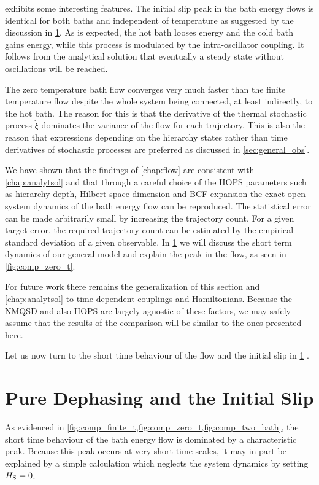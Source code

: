  exhibits some interesting features. The
initial slip peak in the bath energy flows is identical for both baths
and independent of temperature as suggested by the discussion in
\cref{sec:pure_deph}. As is expected, the hot bath looses energy and
the cold bath gains energy, while this process is modulated by the
intra-oscillator coupling. It follows from the analytical solution
that eventually a steady state without oscillations will be reached.

The zero temperature bath flow converges very much faster than the
finite temperature flow despite the whole system being connected, at
least indirectly, to the hot bath. The reason for this is that the
derivative of the thermal stochastic process \(\dot{ξ}\) dominates the
variance of the flow for each trajectory. This is also the reason that
expressions depending on the hierarchy states rather than time
derivatives of stochastic processes are preferred as discussed in
\cref{sec:general_obs}.

We have shown that the findings of \cref{chap:flow} are consistent
with \cref{chap:analytsol} and that through a careful choice of the
HOPS parameters such as hierarchy depth, Hilbert space dimension and
BCF expansion the exact open system dynamics of the bath energy flow
can be reproduced. The statistical error can be made arbitrarily small
by increasing the trajectory count. For a given target error, the
required trajectory count can be estimated by the empirical standard
deviation of a given observable. In \cref{sec:pure_deph} we will
discuss the short term dynamics of our general model and explain the
peak in the flow, as seen in \cref{fig:comp_zero_t}.

For future work there remains the generalization of this section and
\cref{chap:analytsol} to time dependent couplings and
Hamiltonians. Because the NMQSD and also HOPS are largely agnostic of
these factors, we may safely assume that the results of the comparison
will be similar to the ones presented here.

Let us now turn to the short time behaviour of the flow and the
initial slip in \cref{sec:pure_deph} .

\section{Pure Dephasing and the Initial Slip}
\label{sec:pure_deph}
As evidenced in
\cref{fig:comp_finite_t,fig:comp_zero_t,fig:comp_two_bath}, the short
time behaviour of the bath energy flow is dominated by a
characteristic peak. Because this peak occurs at very short time
scales, it may in part be explained by a simple calculation which
neglects the system dynamics by setting \(H_{\mathrm{S}}=0\).

